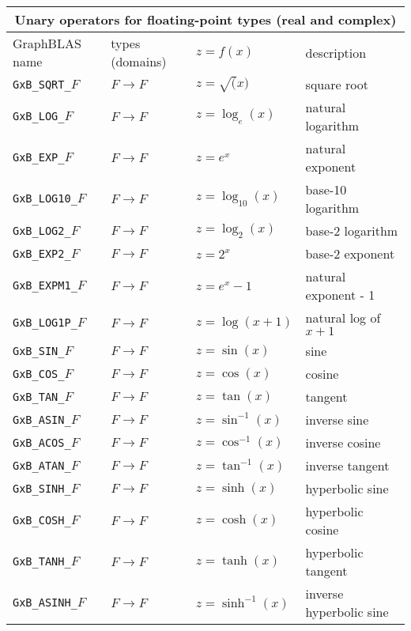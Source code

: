 \documentclass[12pt]{article}
\begin{document}
{{\begin{tabular}{|llll|}
\hline
\multicolumn{4}{|c|}{Unary operators for floating-point types (real and complex)} \\
\hline
GraphBLAS name          & types (domains)   & $z=f(x)$      & description \\
\hline
\verb'GxB_SQRT_'$F$     & $F \rightarrow F$ & $z = \sqrt(x)$       & square root \\
\verb'GxB_LOG_'$F$      & $F \rightarrow F$ & $z = \log_e(x)$      & natural logarithm \\
\verb'GxB_EXP_'$F$      & $F \rightarrow F$ & $z = e^x$            & natural exponent \\
\hline
\verb'GxB_LOG10_'$F$    & $F \rightarrow F$ & $z = \log_{10}(x)$   & base-10 logarithm \\
\verb'GxB_LOG2_'$F$     & $F \rightarrow F$ & $z = \log_2(x)$      & base-2 logarithm \\
\verb'GxB_EXP2_'$F$     & $F \rightarrow F$ & $z = 2^x$            & base-2 exponent \\
\hline
\verb'GxB_EXPM1_'$F$    & $F \rightarrow F$ & $z = e^x - 1$        & natural exponent - 1 \\
\verb'GxB_LOG1P_'$F$    & $F \rightarrow F$ & $z = \log(x+1)$      & natural log of $x+1$ \\
\hline
\verb'GxB_SIN_'$F$      & $F \rightarrow F$ & $z = \sin(x)$        & sine \\
\verb'GxB_COS_'$F$      & $F \rightarrow F$ & $z = \cos(x)$        & cosine \\
\verb'GxB_TAN_'$F$      & $F \rightarrow F$ & $z = \tan(x)$        & tangent \\
\hline
\verb'GxB_ASIN_'$F$     & $F \rightarrow F$ & $z = \sin^{-1}(x)$        & inverse sine \\
\verb'GxB_ACOS_'$F$     & $F \rightarrow F$ & $z = \cos^{-1}(x)$        & inverse cosine \\
\verb'GxB_ATAN_'$F$     & $F \rightarrow F$ & $z = \tan^{-1}(x)$        & inverse tangent \\
\hline
\verb'GxB_SINH_'$F$     & $F \rightarrow F$ & $z = \sinh(x)$        & hyperbolic sine \\
\verb'GxB_COSH_'$F$     & $F \rightarrow F$ & $z = \cosh(x)$        & hyperbolic cosine \\
\verb'GxB_TANH_'$F$     & $F \rightarrow F$ & $z = \tanh(x)$        & hyperbolic tangent \\
\hline
\verb'GxB_ASINH_'$F$    & $F \rightarrow F$ & $z = \sinh^{-1}(x)$        & inverse hyperbolic sine \\

\end{tabular}}}
\end{document}
